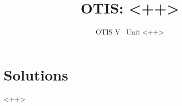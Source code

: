 \documentclass[10pt]{scrartcl}
\title{\vspace{0em}OTIS: <++>}
\date{OTIS V \textemdash\  Unit <++>}
\begin{document}
\maketitle
\tableofcontents

\section{Solutions}
<++>
\end{document}

